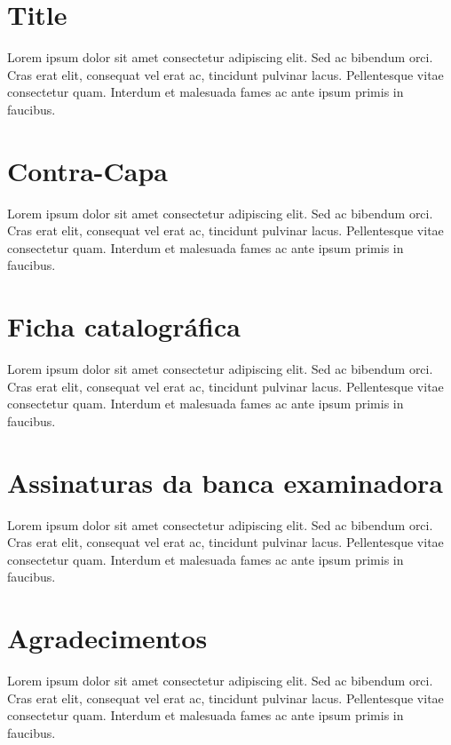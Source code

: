 \documentclass[11pt, a4paper]{report}
\begin{document}
\singlespacing

\section*{Title}
\par Lorem ipsum dolor sit amet consectetur adipiscing elit. Sed ac bibendum orci. Cras erat elit, consequat vel erat ac, tincidunt pulvinar lacus. Pellentesque vitae consectetur quam. Interdum et malesuada fames ac ante ipsum primis in faucibus.
\clearpage	

\section*{Contra-Capa}
\par Lorem ipsum dolor sit amet consectetur adipiscing elit. Sed ac bibendum orci. Cras erat elit, consequat vel erat ac, tincidunt pulvinar lacus. Pellentesque vitae consectetur quam. Interdum et malesuada fames ac ante ipsum primis in faucibus.
\clearpage

\section*{Ficha catalográfica}
\par Lorem ipsum dolor sit amet consectetur adipiscing elit. Sed ac bibendum orci. Cras erat elit, consequat vel erat ac, tincidunt pulvinar lacus. Pellentesque vitae consectetur quam. Interdum et malesuada fames ac ante ipsum primis in faucibus.
\clearpage

\section*{Assinaturas da banca examinadora}
\par Lorem ipsum dolor sit amet consectetur adipiscing elit. Sed ac bibendum orci. Cras erat elit, consequat vel erat ac, tincidunt pulvinar lacus. Pellentesque vitae consectetur quam. Interdum et malesuada fames ac ante ipsum primis in faucibus.
\clearpage

\section*{Agradecimentos}
\par Lorem ipsum dolor sit amet consectetur adipiscing elit. Sed ac bibendum orci. Cras erat elit, consequat vel erat ac, tincidunt pulvinar lacus. Pellentesque vitae consectetur quam. Interdum et malesuada fames ac ante ipsum primis in faucibus.
\clearpage
\end{document}
